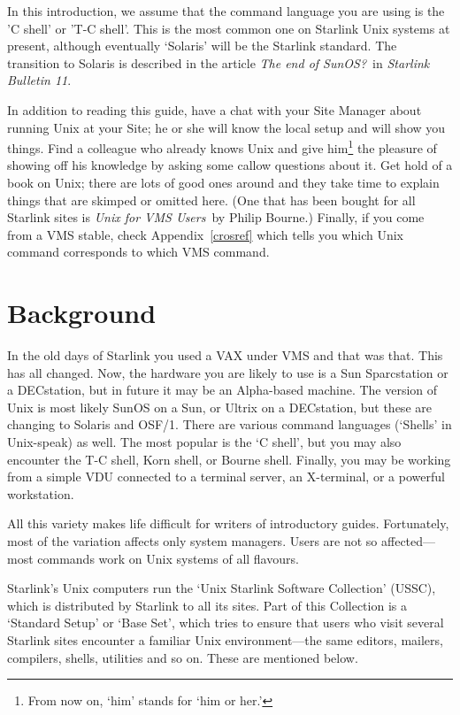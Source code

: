 In this introduction, we assume that the command language you are using is the
'C shell' or 'T-C shell'.
This is the most common one on Starlink Unix systems at present, although
eventually `Solaris' will be the Starlink standard.
The transition to Solaris is described in the article {\em The end of SunOS?}\,
in {\em Starlink Bulletin 11}.

In addition to reading this guide, have a chat with your Site Manager about
running Unix at your Site; he or she will know the local setup and will show
you things.
Find a colleague who already knows Unix and give him\footnote{From now on,
`him' stands for `him or her.'} the pleasure of showing off his knowledge by
asking some callow questions about it.
Get hold of a book on Unix; there are lots of good ones around and
they take time to explain things that are skimped or omitted here.
(One that has been bought for all Starlink sites is {\em Unix for VMS Users}\,
by Philip Bourne.)
Finally, if you come from a VMS stable, check Appendix~\ref{crosref} which
tells you which Unix command corresponds to which VMS command.

\section{Background}

In the old days of Starlink you used a VAX under VMS and that was that.
This has all changed.
Now, the hardware you are likely to use is a Sun Sparcstation or a DECstation,
but in future it may be an Alpha-based machine.
The version of Unix is most likely SunOS on a Sun, or Ultrix on a DECstation,
but these are changing to Solaris and OSF/1.
There are various command languages (`Shells' in Unix-speak) as well.
The most popular is the `C shell', but you may also encounter the T-C shell,
Korn shell, or Bourne shell.
Finally, you may be working from a simple VDU connected to a terminal server,
an X-terminal, or a powerful workstation.

All this variety makes life difficult for writers of introductory guides.
Fortunately, most of the variation affects only system managers.
Users are not so affected---most commands work on Unix systems of
all flavours.

Starlink's Unix computers run the `Unix Starlink Software Collection' (USSC),
which is distributed by Starlink to all its sites.
Part of this Collection is a `Standard Setup' or `Base Set', which tries to
ensure that users who visit several Starlink sites encounter a familiar Unix
environment---the same editors, mailers, compilers, shells, utilities and so on.
These are mentioned below.

